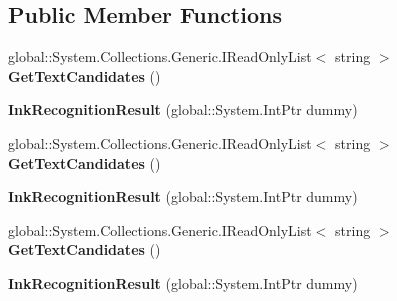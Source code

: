 \subsection*{Public Member Functions}
\begin{DoxyCompactItemize}
\item 
\mbox{\label{class_windows_1_1_u_i_1_1_input_1_1_inking_1_1_ink_recognition_result_a160a774b2efd7084843759d066bd82f2}} 
global\+::\+System.\+Collections.\+Generic.\+I\+Read\+Only\+List$<$ string $>$ {\bfseries Get\+Text\+Candidates} ()
\item 
\mbox{\label{class_windows_1_1_u_i_1_1_input_1_1_inking_1_1_ink_recognition_result_a3b3845719108524a1e3e54bdf0f35e21}} 
{\bfseries Ink\+Recognition\+Result} (global\+::\+System.\+Int\+Ptr dummy)
\item 
\mbox{\label{class_windows_1_1_u_i_1_1_input_1_1_inking_1_1_ink_recognition_result_a160a774b2efd7084843759d066bd82f2}} 
global\+::\+System.\+Collections.\+Generic.\+I\+Read\+Only\+List$<$ string $>$ {\bfseries Get\+Text\+Candidates} ()
\item 
\mbox{\label{class_windows_1_1_u_i_1_1_input_1_1_inking_1_1_ink_recognition_result_a3b3845719108524a1e3e54bdf0f35e21}} 
{\bfseries Ink\+Recognition\+Result} (global\+::\+System.\+Int\+Ptr dummy)
\item 
\mbox{\label{class_windows_1_1_u_i_1_1_input_1_1_inking_1_1_ink_recognition_result_a160a774b2efd7084843759d066bd82f2}} 
global\+::\+System.\+Collections.\+Generic.\+I\+Read\+Only\+List$<$ string $>$ {\bfseries Get\+Text\+Candidates} ()
\item 
\mbox{\label{class_windows_1_1_u_i_1_1_input_1_1_inking_1_1_ink_recognition_result_a3b3845719108524a1e3e54bdf0f35e21}} 
{\bfseries Ink\+Recognition\+Result} (global\+::\+System.\+Int\+Ptr dummy)
\item 
\mbox{\label{class_windows_1_1_u_i_1_1_input_1_1_inking_1_1_ink_recognition_result_a160a774b2efd7084843759d066bd82f2}} 

\end{DoxyCompactItemize}
